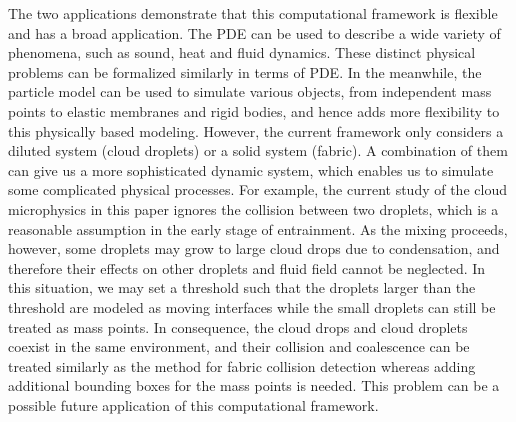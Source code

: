 The two applications demonstrate that this computational framework is flexible
and has a broad application. The PDE can be used to describe a wide variety of
phenomena, such as sound, heat and fluid dynamics. These distinct physical
problems can be formalized similarly in terms of PDE. In the meanwhile, the
particle model can be used to simulate various objects, from independent mass
points to elastic membranes and rigid bodies, and hence adds more flexibility
to this physically based modeling. However, the current framework only
considers a diluted system (cloud droplets) or a solid system (fabric). A
combination of them can give us a more sophisticated dynamic system, which
enables us to simulate some complicated physical processes. For example, the
current study of the cloud microphysics in this paper ignores the collision
between two droplets, which is a reasonable assumption in the early stage of
entrainment. As the mixing proceeds, however, some droplets may grow to large
cloud drops due to condensation, and therefore their effects on other droplets
and fluid field cannot be neglected. In this situation, we may set a threshold
such that the droplets larger than the threshold are modeled as moving
interfaces while the small droplets can still be treated as mass points. In
consequence, the cloud drops and cloud droplets coexist in the same
environment, and their collision and coalescence can be treated similarly as
the method for fabric collision detection whereas adding additional bounding
boxes for the mass points is needed. This problem can be a possible future application of this computational framework.  
